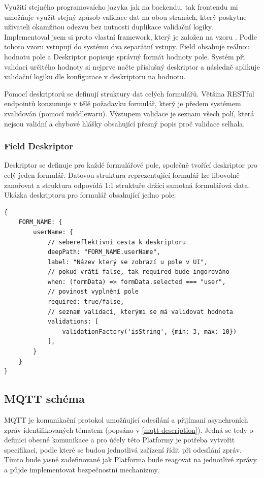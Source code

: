 Využití stejného programovaícho jazyka jak na backendu, tak frontendu mi umožňuje využít stejný způsob validace dat na obou stranách, který poskytne uživateli okamžitou odezvu bez nutnosti duplikace validační logiky. Implementoval jsem si proto vlastní framework, který je založen na vzoru  \cite{field-descriptor-pattern}. Podle tohoto vzoru vstupují do systému dva separátní vstupy. Field obsahuje reálnou hodnotu pole a Deskriptor popisuje správný formát hodnoty pole. Systém při validaci určitého hodnoty si nejprve načte příslušný deskriptor a následně aplikuje validační logiku dle konfigurace v deskriptoru na hodnotu.

Pomocí deskriptorů se definují struktury dat celých formulářů. Většina RESTful endpointů konzumuje v tělě požadavku formulář, který je předem systémem zvalidován (pomocí middlewaru). Výstupem validace je seznam všech polí, která nejsou validní a chybové hlášky obsahující přesný popis proč validace selhala.

\subsubsection{Field Deskriptor}
Deskriptor se definuje pro každé formulářové pole, společně tvořící deskriptor pro celý jeden formulář. Datovou struktura reprezentující formulář lze libovolně zanořovat a struktura odpovídá 1:1 struktuře držící samotná formulářová data. Ukázka deskriptoru pro formulář obsahující jedno pole:

\begin{verbatim}
{
    FORM_NAME: {
        userName: {
            // sebereflektivní cesta k deskriptoru
            deepPath: "FORM_NAME.userName",        
            label: "Název který se zobrazí u pole v UI",
            // pokud vrátí false, tak required bude ingorováno
            when: (formData) => formData.selected === "user", 
            // povinost vyplnění pole 
            required: true/false,
            // seznam validací, kterými se má validovat hodnota
            validations: [
                validationFactory('isString', {min: 3, max: 10})
            ],   
        }
    }
}
\end{verbatim}


\subsection{MQTT schéma}
MQTT je komunikační protokol umožňující odesílání a přijímaní asynchroních zpráv identifikovaných tématem (popsáno v \ref{mqtt-description}). Jedná se tedy o definici obecné komunikace a pro účely této Platformy je potřeba vytvořit specifikaci, podle které se budou jednotlivá zařízení řídit při odesílání zpráv. Tímto bude jasně zadefinované jak Platforma bude reagovat na jednotlivé zprávy a půjde implementovat bezpečnostní mechanizmy.

